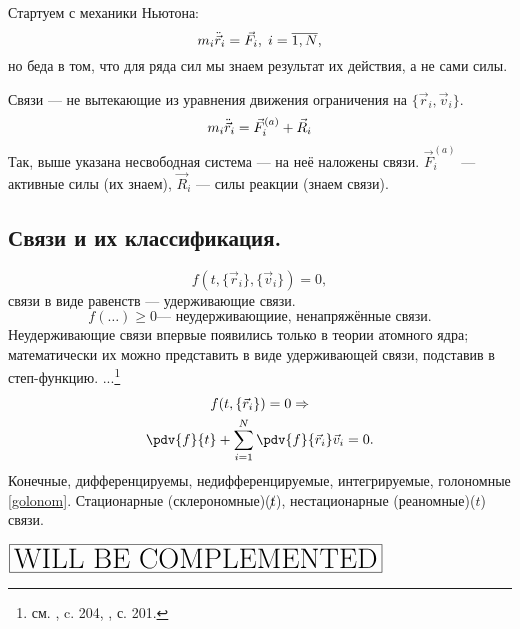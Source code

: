 Стартуем с механики Ньютона:
\[m_i \Ddot{\vec{r}}_i = \Vec{F}_i,\; i=\overline{1,N}, \] но беда в том, что для ряда сил мы знаем результат их действия, а не сами силы.
\begin{dfn}
Связи  --- не вытекающие из уравнения движения ограничения на $\lbrace\vec{r}_i, \vec{v}_i\rbrace$.
\[m_i \Ddot{\vec{r}}_i = \vec{F}_i^{(a)} + \vec{R}_i \] Так, выше указана несвободная система --- на неё наложены связи. $\vec{F}_i^{(a)}$ --- активные силы (их знаем), $\vec{R}_i$ --- силы реакции (знаем связи).
\end{dfn}
\subsection{Связи и их классификация.}
\[f(t, \lbrace\vec{r}_i\rbrace, \lbrace\vec{v}_i \rbrace) = 0,\] связи в виде равенств --- удерживающие связи.
\[f(\dots) \geqslant 0 \text{--- неудерживающиие, ненапряжённые связи.}\] Неудерживающие связи впервые появились только в теории атомного ядра; математически их можно представить в виде удерживающей связи, подставив в степ-функцию.
...\footnote{см. \cite{OlhTM}, c. 204, \cite{GantnakherTM}, с. 201.}
\begin{gather}
f(t, \lbrace\vec{r}_i\rbrace) = 0 \Rightarrow \notag\\
\pdv{f}{t} + \sum_{i=1}^N \pdv{f}{\vec{r}_i} \vec{v}_i = 0. \label{golonom}
\end{gather}
Конечные, дифференцируемы, недифференцируемые, интегрируемые, голономные \eqref{golonom}.
Стационарные (склерономные)($\not t$), нестационарные (реаномные)($t$) связи.
\begin{ex}

\end{ex}


$\boxed{\text{\huge{WILL BE COMPLEMENTED}}}$